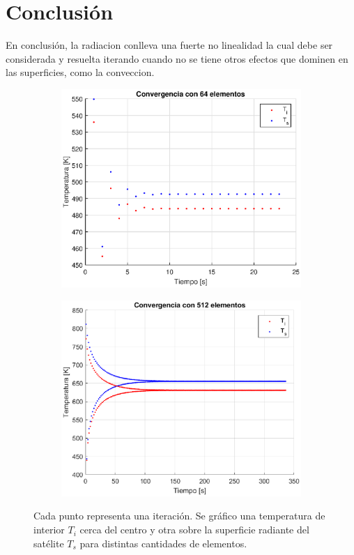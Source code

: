 \documentclass[onecolumn,10pt,titlepage,a4paper]{article}
\begin{document}
\section*{Conclusión}
En conclusión, la radiacion conlleva una fuerte no linealidad la cual debe ser considerada y resuelta iterando cuando no se tiene otros efectos que dominen en las superficies, como la conveccion. 

\begin{figure}[htb!]
	\centering
	\begin{subfigure}{0.47\textwidth}
\includegraphics[width=\textwidth]{fig/conv64.eps}
\label{fig:Convergencia64}
	\end{subfigure}
	\hfill
	\begin{subfigure}{0.5\textwidth}
	\includegraphics[width=\textwidth]{fig/conv512.eps}
\label{fig:Convergencia512}
	\end{subfigure}
\caption{Cada punto representa una iteración. Se gráfico una temperatura de interior $T_i$ cerca del centro y otra sobre la superficie radiante del satélite $T_s$ para distintas cantidades de elementos.}
\label{fig:Convergencia}
\end{figure}
\end{document}
